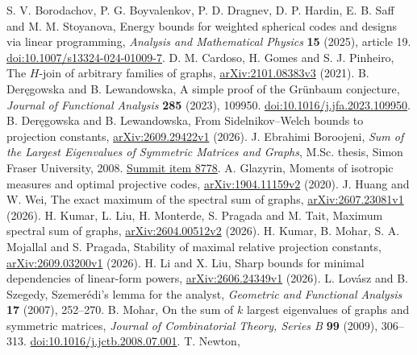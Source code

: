 \raggedright
{}
S. V. Borodachov, P. G. Boyvalenkov, P. D. Dragnev, D. P. Hardin,
E. B. Saff and M. M. Stoyanova,
Energy bounds for weighted spherical codes and designs via linear programming,
\emph{Analysis and Mathematical Physics} \textbf{15} (2025), article 19.
\href{https://doi.org/10.1007/s13324-024-01009-7}{doi:10.1007/s13324-024-01009-7}.
D. M. Cardoso, H. Gomes and S. J. Pinheiro,
The $H$-join of arbitrary families of graphs,
\href{https://arxiv.org/abs/2101.08383v3}{arXiv:2101.08383v3} (2021).
B. Der\k{e}gowska and B. Lewandowska,
A simple proof of the Gr\"unbaum conjecture,
\emph{Journal of Functional Analysis} \textbf{285} (2023), 109950.
\href{https://doi.org/10.1016/j.jfa.2023.109950}{doi:10.1016/j.jfa.2023.109950}.
B. Der\k{e}gowska and B. Lewandowska,
From Sidelnikov--Welch bounds to projection constants,
\href{https://arxiv.org/abs/2609.29422v1}{arXiv:2609.29422v1} (2026).
J. Ebrahimi Boroojeni,
\emph{Sum of the Largest Eigenvalues of Symmetric Matrices and Graphs},
M.Sc. thesis, Simon Fraser University, 2008.
\href{https://summit.sfu.ca/item/8778}{Summit item 8778}.
A. Glazyrin,
Moments of isotropic measures and optimal projective codes,
\href{https://arxiv.org/abs/1904.11159v2}{arXiv:1904.11159v2} (2020).
J. Huang and W. Wei,
The exact maximum of the spectral sum of graphs,
\href{https://arxiv.org/abs/2607.23081v1}{arXiv:2607.23081v1} (2026).
H. Kumar, L. Liu, H. Monterde, S. Pragada and M. Tait,
Maximum spectral sum of graphs,
\href{https://arxiv.org/abs/2604.00512v2}{arXiv:2604.00512v2} (2026).
H. Kumar, B. Mohar, S. A. Mojallal and S. Pragada,
Stability of maximal relative projection constants,
\href{https://arxiv.org/abs/2609.03200v1}{arXiv:2609.03200v1} (2026).
H. Li and X. Liu,
Sharp bounds for minimal dependencies of linear-form powers,
\href{https://arxiv.org/abs/2606.24349v1}{arXiv:2606.24349v1} (2026).
L. Lov\'asz and B. Szegedy,
Szemer\'edi's lemma for the analyst,
\emph{Geometric and Functional Analysis} \textbf{17} (2007), 252--270.
B. Mohar,
On the sum of $k$ largest eigenvalues of graphs and symmetric matrices,
\emph{Journal of Combinatorial Theory, Series B} \textbf{99} (2009), 306--313.
\href{https://doi.org/10.1016/j.jctb.2008.07.001}{doi:10.1016/j.jctb.2008.07.001}.
T. Newton,
